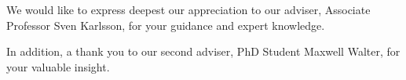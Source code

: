 We would like to express deepest our appreciation to our adviser, Associate
Professor Sven Karlsson, for your guidance and expert knowledge.


In addition, a thank you to our second adviser, PhD Student Maxwell Walter, for
your valuable insight.

